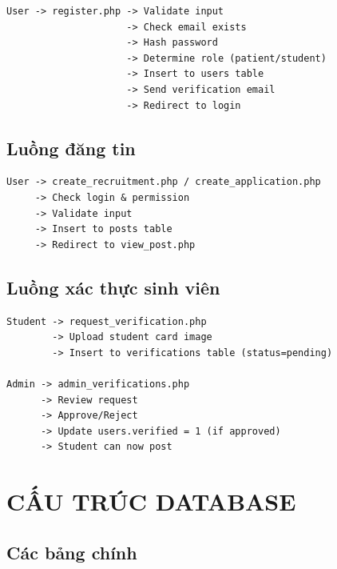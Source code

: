 \documentclass[a4paper,12pt]{article}
\begin{document}
\begin{verbatim}
User -> register.php -> Validate input
                     -> Check email exists
                     -> Hash password
                     -> Determine role (patient/student)
                     -> Insert to users table
                     -> Send verification email
                     -> Redirect to login
\end{verbatim}

\subsection{Luồng đăng tin}

\begin{verbatim}
User -> create_recruitment.php / create_application.php
     -> Check login & permission
     -> Validate input
     -> Insert to posts table
     -> Redirect to view_post.php
\end{verbatim}

\subsection{Luồng xác thực sinh viên}

\begin{verbatim}
Student -> request_verification.php
        -> Upload student card image
        -> Insert to verifications table (status=pending)

Admin -> admin_verifications.php
      -> Review request
      -> Approve/Reject
      -> Update users.verified = 1 (if approved)
      -> Student can now post
\end{verbatim}

\section{CẤU TRÚC DATABASE}

\subsection{Các bảng chính}
\end{document}

